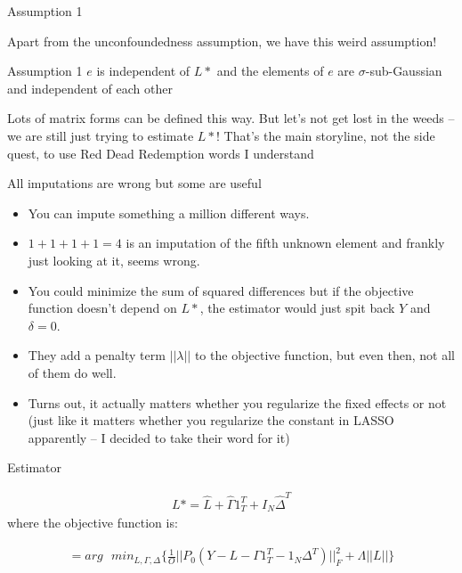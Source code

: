 \documentclass{beamer}
\begin{document}
\begin{frame}{Assumption 1}

Apart from the unconfoundedness assumption, we have this weird assumption!

\begin{block}{Assumption 1}
$e$ is independent of $L*$ and the elements of $e$ are $\sigma$-sub-Gaussian and independent of each other
\end{block}

Lots of matrix forms can be defined this way.  But let's not get lost in the weeds -- we are still just trying to estimate $L*$!  That's the main storyline, not the side quest, to use Red Dead Redemption words I understand

\end{frame}

\begin{frame}{All imputations are wrong but some are useful}	
	
\begin{itemize}
\item You can impute something a million different ways.  
\item $1+1+1+1 = 4$ is an imputation of the fifth unknown element and frankly just looking at it, seems wrong.
\item You could minimize the sum of squared differences but if the objective function doesn't depend on $L*$, the estimator would just spit back $Y$ and $\delta=0$. 
\item They add a penalty term $||\lambda||$ to the objective function, but even then, not all of them do well. 
\item Turns out, it actually matters whether you regularize the fixed effects or not (just like it matters whether you regularize the constant in LASSO apparently -- I decided to take their word for it)
\end{itemize}

\end{frame}

\begin{frame}{Estimator}

\begin{eqnarray*}
L* = \widehat{L} + \widehat{\Gamma}1_T^T + I_N\widehat{\Delta}^T
\end{eqnarray*}where the objective function is:

\begin{eqnarray*}
= arg\text{ }min_{L,\Gamma,\Delta} \bigg \{ \frac{1}{O} || P_0(Y-L-\Gamma 1_T^T - 1_N\Delta^T)||_F^2 + \Lambda||L|| \bigg \}
\end{eqnarray*}

\end{frame}
\end{document}

